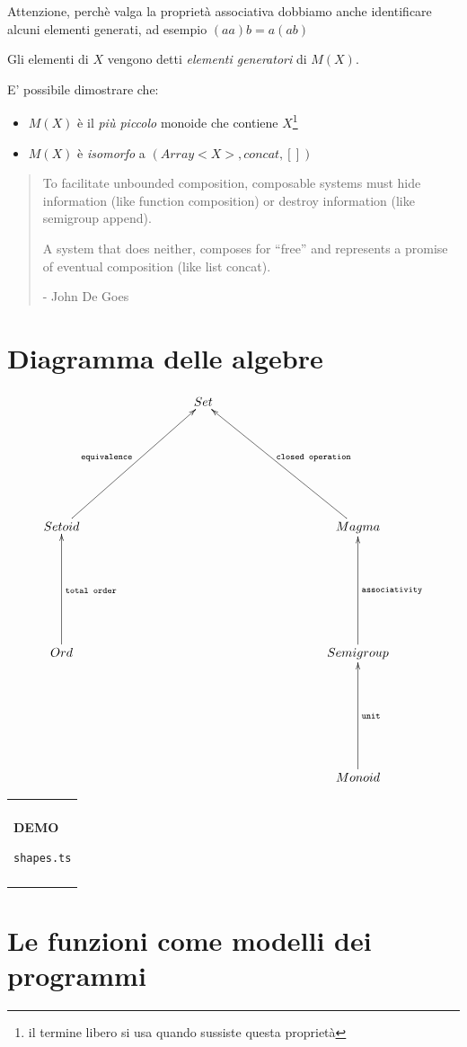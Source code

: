 \documentclass[12pt]{article}
\theoremstyle{definition}
\newenvironment{demo}
    {\begin{center}
    \begin{tabular}{|p{0.9\textwidth}|}
    \hline\\
    }
    {
    \\\\\hline
    \end{tabular}
    \end{center}
    }
\begin{document}
Attenzione, perchè valga la proprietà associativa dobbiamo anche identificare alcuni elementi generati, ad esempio $(aa)b = a(ab)$

Gli elementi di $X$ vengono detti \emph{elementi generatori} di $M(X)$.

E' possibile dimostrare che:

\begin{itemize}
  \item $M(X)$ è il \emph{più piccolo} monoide che contiene $X$\footnote{il termine libero si usa quando sussiste questa proprietà}
  \item $M(X)$ è \emph{isomorfo} a $(Array<X>, concat, [])$
\end{itemize}

\begin{quote}
To facilitate unbounded composition, composable systems must hide information (like function composition) or destroy information
(like semigroup append).

A system that does neither, composes for “free” and represents a promise of eventual composition (like list concat).

- John De Goes
\end{quote}

\section{Diagramma delle algebre}

\[
\xymatrixrowsep{3cm}
\xymatrixcolsep{3cm}
\xymatrix{
  & Set \\
  Setoid \ar[ur]^{\texttt{equivalence}} & & Magma \ar[ul]_{\texttt{closed operation}} \\
  Ord \ar[u]_{\texttt{total order}} & & Semigroup \ar[u]_{\texttt{associativity}} \\
  & & Monoid \ar[u]_{\texttt{unit}} \\
}
\]

\begin{demo}
\begin{center}
\textbf{DEMO}

\texttt{shapes.ts}
\end{center}
\end{demo}

\newpage

\section{Le funzioni come modelli dei programmi}
\end{document}
